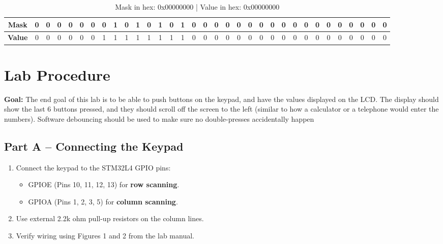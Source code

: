 \documentclass[12pt]{article}
\begin{document}
\begin{table}[H]
\begin{tabular}{|c|*{32}{c|}}
        \textbf{Mask}
        & 0 & 0 & 0 & 0 
        & 0 & 0 & 0 & 1 
        & 0 & 1 & 0 & 1 
        & 0 & 1 & 0 & 0
        & 0 & 0 & 0 & 0
        & 0 & 0 & 0 & 0
        & 0 & 0 & 0 & 0
        & 0 & 0 & 0 & 0 \\ \hline
       
        \textbf{Value} 
        & 0 & 0 & 0 & 0 
        & 0 & 0 & 1 & 1 
        & 1 & 1 & 1 & 1
        & 1 & 1 & 0 & 0
        & 0 & 0 & 0 & 0
        & 0 & 0 & 0 & 0
        & 0 & 0 & 0 & 0
        & 0 & 0 & 0 & 0 \\ \hline
        
    \end{tabular}
    \caption{Mask in hex: 0x00000000 | Value in hex: 0x00000000}
    \label{tab:moder_configuration1}
\end{table}
\bigskip

\section{Lab Procedure}
\textbf{Goal: }  The end goal of this lab is to be able to push buttons on the keypad, and have the values displayed on the
 LCD. The display should show the last 6 buttons pressed, and they should scroll off the screen to the left
 (similar to how a calculator or a telephone would enter the numbers). Software debouncing should be used
 to make sure no double-presses accidentally happen

\subsection{Part A – Connecting the Keypad}
\begin{enumerate}
    \item Connect the keypad to the STM32L4 GPIO pins:
    \begin{itemize}
        \item GPIOE (Pins 10, 11, 12, 13) for \textbf{row scanning}.
        \item GPIOA (Pins 1, 2, 3, 5) for \textbf{column scanning}.
    \end{itemize}
    \item Use external 2.2k ohm pull-up resistors on the column lines.
    \item Verify wiring using Figures 1 and 2 from the lab manual.
\end{enumerate}
\end{document}
